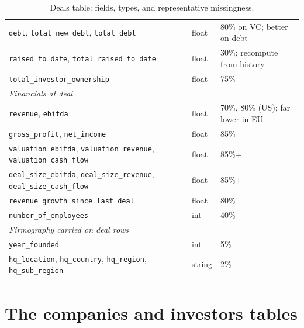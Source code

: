 \begin{table}[htbp]
\begin{tabular}{llp{5.0cm}}
\texttt{debt}, \texttt{total\_new\_debt}, \texttt{total\_debt} & float & 80\% on VC; better on debt \\
\texttt{raised\_to\_date}, \texttt{total\_raised\_to\_date} & float & 30\%; recompute from history \\
\texttt{total\_investor\_ownership} & float & 75\% \\
\midrule
\multicolumn{3}{l}{\emph{Financials at deal}} \\
\texttt{revenue}, \texttt{ebitda} & float & 70\%, 80\% (US); far lower in EU \\
\texttt{gross\_profit}, \texttt{net\_income} & float & 85\% \\
\texttt{valuation\_ebitda}, \texttt{valuation\_revenue}, \texttt{valuation\_cash\_flow} & float & 85\%+ \\
\texttt{deal\_size\_ebitda}, \texttt{deal\_size\_revenue}, \texttt{deal\_size\_cash\_flow} & float & 85\%+ \\
\texttt{revenue\_growth\_since\_last\_deal} & float & 80\% \\
\texttt{number\_of\_employees} & int & 40\% \\
\midrule
\multicolumn{3}{l}{\emph{Firmography carried on deal rows}} \\
\texttt{year\_founded} & int & 5\% \\
\texttt{hq\_location}, \texttt{hq\_country}, \texttt{hq\_region}, \texttt{hq\_sub\_region} & string & 2\% \\
\bottomrule
\end{tabular}
\caption{Deals table: fields, types, and representative missingness.}
\label{tab:app-deals}
\end{table}

\section{The companies and investors tables}\label{app:schema-companies}

